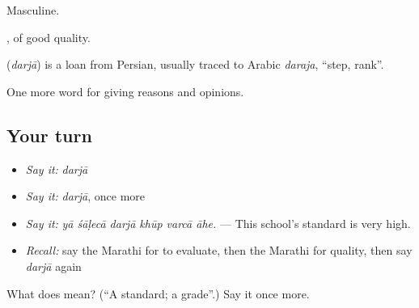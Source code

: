 Masculine.

, of good quality.

\begin{cousinweb}
\textbf{} (\emph{darjā}) is a loan from Persian, usually traced to Arabic \emph{daraja}, \textquotedblleft{}step, rank\textquotedblright{}.
\end{cousinweb}

\begin{grammarlens}[title={What you've built}]
One more word for giving reasons and opinions.
\end{grammarlens}

\subsection*{Your turn}
\begin{itemize}
\raggedright
  \item \emph{Say it:} \emph{darjā}
  \item \emph{Say it:} \emph{darjā}, once more
  \item \emph{Say it:} \emph{yā śāḷecā darjā khūp varcā āhe.} — This school's standard is very high.
  \item \emph{Recall:} say the Marathi for to evaluate, then the Marathi for quality, then say \emph{darjā} again
\end{itemize}

\begin{tcolorbox}[breakable,colback=teal!4,colframe=teal!35!black,title={Before you move on}]
What does  mean? (\textquotedblleft{}A standard; a grade\textquotedblright{}.) Say it once more.
\end{tcolorbox}
